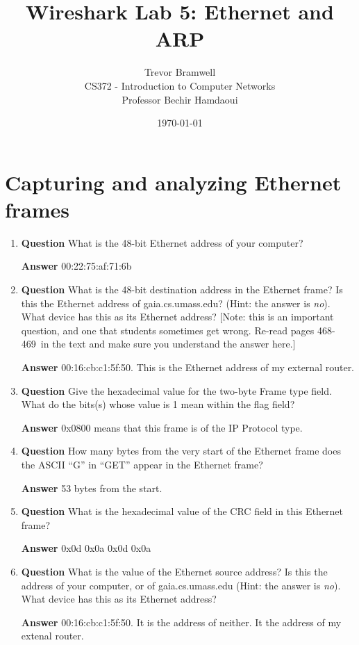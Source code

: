\documentclass[12pt,letterpaper]{article}
\title{Wireshark Lab 5: Ethernet and ARP}
\author{
    Trevor Bramwell \\
    CS372 - Introduction to Computer Networks \\
    Professor Bechir Hamdaoui
}
\date{\today}
\newcommand{\q}{\textbf{Question} }
\newcommand{\ans}{\textbf{Answer} }
\begin{document}
\maketitle

\section{Capturing and analyzing Ethernet frames}

\begin{enumerate}
\item \q What is the 48-bit Ethernet address of your computer?

\ans 00:22:75:af:71:6b

\item \q What is the 48-bit destination address in the Ethernet frame?
    Is this the Ethernet address of gaia.cs.umass.edu? (Hint: the answer
    is \emph{no}). What device has this as its Ethernet address? [Note:
    this is an important question, and one that students sometimes get wrong.
    Re-read pages 468-469\ in the text and make sure you understand the answer
    here.]

\ans 00:16:cb:c1:5f:50. This is the Ethernet address of my external router.

\item \q Give the hexadecimal value for the two-byte Frame type field. What do
    the bits(s) whose value is 1 mean within the flag field?

\ans 0x0800 means that this frame is of the IP Protocol type.

\item \q How many bytes from the very start of the Ethernet frame does the
    ASCII ``G'' in ``GET'' appear in the Ethernet frame?

\ans 53 bytes from the start.

\item \q What is the hexadecimal value of the CRC field in this Ethernet
    frame?

\ans 0x0d 0x0a 0x0d 0x0a

\pagebreak

\pagebreak

\item \q What is the value of the Ethernet source address? Is this the address
    of your computer, or of gaia.cs.umass.edu (Hint: the answer is \emph{no}).
    What device has this as its Ethernet address?

\ans 00:16:cb:c1:5f:50. It is the address of neither. It the address of my
    extenal router.


\end{enumerate}
\end{document}
